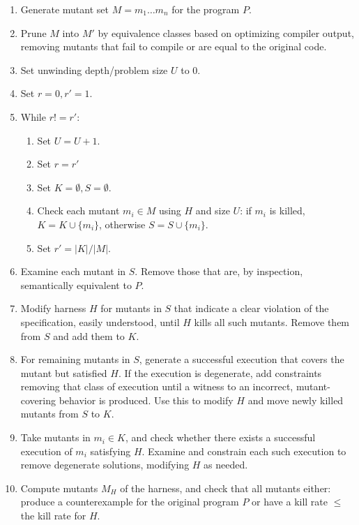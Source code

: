 \documentclass{svjour3}
\begin{document}
\begin{enumerate}
\item Generate mutant set $M = m_1 \ldots m_n$ for the program $P$.
\item Prune $M$ into $M'$ by equivalence classes based on optimizing
  compiler output, removing mutants that fail to compile or are equal
  to the original code.
\item Set unwinding depth/problem size $U$ to 0.
\item Set $r = 0, r' = 1$.
\item While $r != r'$:
\begin{enumerate}
\item Set $U = U + 1$.
\item Set $r = r'$
\item Set $K = \emptyset, S = \emptyset$.
\item Check each mutant $m_i \in M$ using $H$ and size $U$: if $m_i$ is killed, $K = K \cup
  \{m_i\}$, otherwise $S = S \cup \{m_i\}$.
\item Set $r' = |K| / |M|$.  
\end{enumerate}
\item Examine each mutant in $S$.  Remove those that are, by
  inspection, semantically equivalent to $P$.
\item Modify harness $H$ for mutants in $S$ that indicate a clear
  violation of the specification, easily understood, until $H$ kills
  all such mutants.  Remove them from $S$ and add them to $K$.
\item For remaining mutants in $S$, generate a successful execution
  that covers the mutant but satisfied $H$.  If the execution is
  degenerate, add constraints removing that class of execution until a
  witness to an incorrect, mutant-covering behavior is produced.  Use
  this to modify $H$ and move newly killed mutants from $S$ to $K$.
\item Take mutants in $m_i \in K$, and check whether there exists a successful
  execution of $m_i$ satisfying $H$.  Examine and constrain each such
  execution to remove degenerate solutions, modifying $H$ as needed.
\item Compute mutants $M_H$ of the harness, and check that all mutants
  either:  produce a counterexample for the original program $P$ or
  have a kill rate $\leq$ the kill rate for $H$.
\end{enumerate}

\end{document}
